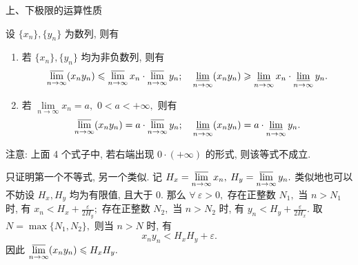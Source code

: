 \begin{frame}{上、下极限的运算性质}

\begin{thm}[乘法运算性质]
设 $\{x_n\}, \{y_n\}$ 为数列, 则有
\begin{enumerate}
\item 若 $\{x_n\}, \{y_n\}$ 均为非负数列, 则有
\[\varlimsup\limits_{n\to\infty} (x_n y_n) \leqslant \varlimsup\limits_{n\to\infty} x_n \cdot \varlimsup\limits_{n\to\infty} y_n;\quad
\varliminf\limits_{n\to\infty} (x_n y_n) \geqslant \varliminf\limits_{n\to\infty} x_n \cdot \varliminf\limits_{n\to\infty} y_n.\]
\item 若 $\lim\limits_{n\to\infty} x_n = a,$ $0 < a < +\infty,$ 则有
\[
\varlimsup\limits_{n\to\infty} (x_n y_n) = a \cdot \varlimsup\limits_{n\to\infty} y_n;\quad
\varliminf\limits_{n\to\infty} (x_n y_n) = a \cdot \varliminf\limits_{n\to\infty} y_n.
\]
\end{enumerate}
\alert{注意:} 上面 4 个式子中, 若右端出现 $0 \cdot (+\infty)$ 的形式, 则该等式不成立.
\end{thm}

\pause

只证明第一个不等式, 另一个类似. 记 $H_x = \varlimsup\limits_{n\to\infty} x_n,$ $H_y = \varlimsup\limits_{n\to\infty} y_n.$ 类似地也可以不妨设 $H_x, H_y$ 均为有限值, 且大于 $0.$ 那么 $\forall~\varepsilon > 0,$ 存在正整数 $N_1,$ 当 $n > N_1$ 时, 有 $x_n < H_x + \frac{\varepsilon}{2H_y};$ 存在正整数 $N_2,$ 当 $n > N_2$ 时, 有 $y_n < H_y + \frac{\varepsilon}{2H_x}.$ 取 $N = \max\{N_1, N_2\},$ 则当 $n > N$ 时, 有
\[
x_n y_n < H_x H_y + \varepsilon.
\]
因此 $\varlimsup\limits_{n\to\infty} (x_n y_n) \leqslant H_x H_y.$

\end{frame}



